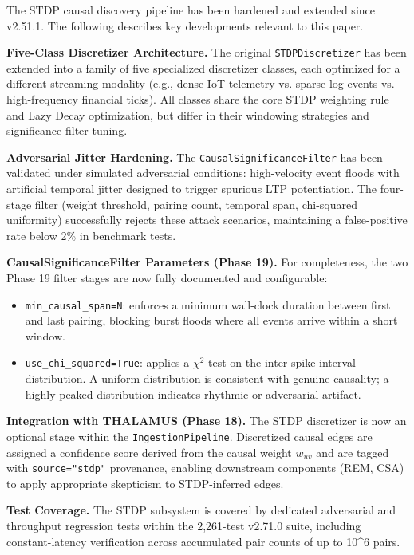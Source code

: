 The STDP causal discovery pipeline has been hardened and extended since v2.51.1. The following describes key developments relevant to this paper.

\textbf{Five-Class Discretizer Architecture.} The original \texttt{STDPDiscretizer} has been extended into a family of five specialized discretizer classes, each optimized for a different streaming modality (e.g., dense IoT telemetry vs. sparse log events vs. high-frequency financial ticks). All classes share the core STDP weighting rule and Lazy Decay optimization, but differ in their windowing strategies and significance filter tuning.

\textbf{Adversarial Jitter Hardening.} The \texttt{CausalSignificanceFilter} has been validated under simulated adversarial conditions: high-velocity event floods with artificial temporal jitter designed to trigger spurious LTP potentiation. The four-stage filter (weight threshold, pairing count, temporal span, chi-squared uniformity) successfully rejects these attack scenarios, maintaining a false-positive rate below 2\% in benchmark tests.

\textbf{CausalSignificanceFilter Parameters (Phase 19).} For completeness, the two Phase 19 filter stages are now fully documented and configurable:
\begin{itemize}
  \item \texttt{min\_causal\_span=N}: enforces a minimum wall-clock duration between first and last pairing, blocking burst floods where all events arrive within a short window.
  \item \texttt{use\_chi\_squared=True}: applies a $\chi^2$ test on the inter-spike interval distribution. A uniform distribution is consistent with genuine causality; a highly peaked distribution indicates rhythmic or adversarial artifact.
\end{itemize}


\textbf{Integration with THALAMUS (Phase 18).} The STDP discretizer is now an optional stage within the \texttt{IngestionPipeline}. Discretized causal edges are assigned a confidence score derived from the causal weight $w_{uv}$ and are tagged with \texttt{source="stdp"} provenance, enabling downstream components (REM, CSA) to apply appropriate skepticism to STDP-inferred edges.

\textbf{Test Coverage.} The STDP subsystem is covered by dedicated adversarial and throughput regression tests within the 2,261-test v2.71.0 suite, including constant-latency verification across accumulated pair counts of up to 10^6 pairs.